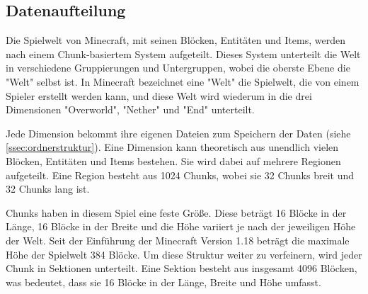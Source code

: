 


\subsection{Datenaufteilung} \label{ssec:datenaufteilung}
Die Spielwelt von Minecraft, mit seinen Blöcken, Entitäten und Items, werden nach einem Chunk-basiertem System aufgeteilt. Dieses System unterteilt die Welt in verschiedene Gruppierungen und Untergruppen, wobei die oberste Ebene die "Welt" selbst ist. In Minecraft bezeichnet eine "Welt" die Spielwelt, die von einem Spieler erstellt werden kann, und diese Welt wird wiederum in die drei Dimensionen "Overworld", "Nether" und "End" unterteilt.\cite{minecraftWorld}

Jede Dimension bekommt ihre eigenen Dateien zum Speichern der Daten (siehe \ref{ssec:ordnerstruktur}). Eine Dimension kann theoretisch aus unendlich vielen Blöcken, Entitäten und Items bestehen. Sie wird dabei auf mehrere Regionen aufgeteilt. Eine Region besteht aus 1024 Chunks, wobei sie 32 Chunks breit und 32 Chunks lang ist.\cite{minecraftRegionFile} 

Chunks haben in diesem Spiel eine feste Größe. Diese beträgt 16 Blöcke in der Länge, 16 Blöcke in der Breite und die Höhe variiert je nach der jeweiligen Höhe der Welt. Seit der Einführung der Minecraft Version 1.18 beträgt die maximale Höhe der Spielwelt 384 Blöcke.\cite{minecraftNewestJavaEdition}\cite{minecraftNewestBedrockEdition} Um diese Struktur weiter zu verfeinern, wird jeder Chunk in Sektionen unterteilt. Eine Sektion besteht aus insgesamt 4096 Blöcken, was bedeutet, dass sie 16 Blöcke in der Länge, Breite und Höhe umfasst.\cite{minecraftChunk}




